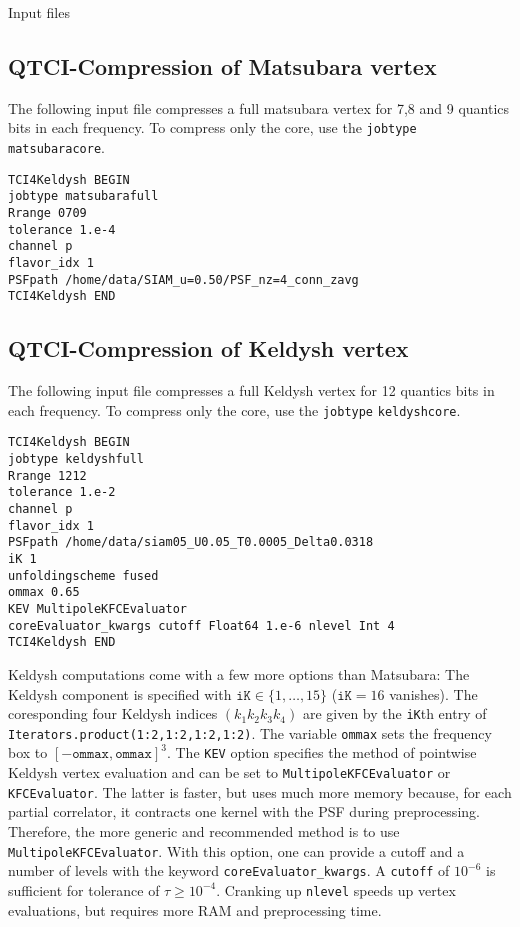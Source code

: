 \documentclass[12pt]{article}
\begin{document}
\begin{section}{Input files}
\subsection{QTCI-Compression of Matsubara vertex}
The following input file compresses a full matsubara vertex for 7,8 and 9 quantics bits in each frequency.
To compress only the core, use the \texttt{jobtype} \texttt{matsubaracore}.
\begin{verbatim}
TCI4Keldysh BEGIN
jobtype matsubarafull
Rrange 0709
tolerance 1.e-4
channel p
flavor_idx 1
PSFpath /home/data/SIAM_u=0.50/PSF_nz=4_conn_zavg
TCI4Keldysh END 
\end{verbatim}
\subsection{QTCI-Compression of Keldysh vertex}
\label{subsec:KeldyshCompression}
The following input file compresses a full Keldysh vertex for 12 quantics bits in each frequency.
To compress only the core, use the \texttt{jobtype} \texttt{keldyshcore}.
\begin{verbatim}
TCI4Keldysh BEGIN
jobtype keldyshfull
Rrange 1212
tolerance 1.e-2
channel p
flavor_idx 1
PSFpath /home/data/siam05_U0.05_T0.0005_Delta0.0318
iK 1
unfoldingscheme fused
ommax 0.65
KEV MultipoleKFCEvaluator
coreEvaluator_kwargs cutoff Float64 1.e-6 nlevel Int 4
TCI4Keldysh END 
\end{verbatim}
Keldysh computations come with a few more options than Matsubara: The Keldysh component is
specified with $\texttt{iK}\in\{1,\ldots,15\}$ ($\texttt{iK}=16$ vanishes). The coresponding four Keldysh indices
$(k_1k_2k_3k_4)$ are given by the \texttt{iK}th entry of \texttt{Iterators.product(1:2,1:2,1:2,1:2)}.
The variable \texttt{ommax} sets the frequency box to $[-\texttt{ommax},\texttt{ommax}]^3$.
The \texttt{KEV} option specifies the method of pointwise Keldysh vertex evaluation and can be set to
\texttt{MultipoleKFCEvaluator} or \texttt{KFCEvaluator}. The latter is faster, but uses much more memory because,
for each partial correlator, it contracts one kernel with the PSF during preprocessing.
Therefore, the more generic and recommended method is to use \texttt{MultipoleKFCEvaluator}.
With this option, one can provide a cutoff and a number of levels with the keyword \texttt{coreEvaluator\_kwargs}.
A \texttt{cutoff} of $10^{-6}$ is sufficient for tolerance of $\tau\geq10^{-4}$. Cranking up \texttt{nlevel} speeds
up vertex evaluations, but requires more RAM and preprocessing time.

\end{section}
\end{document}
